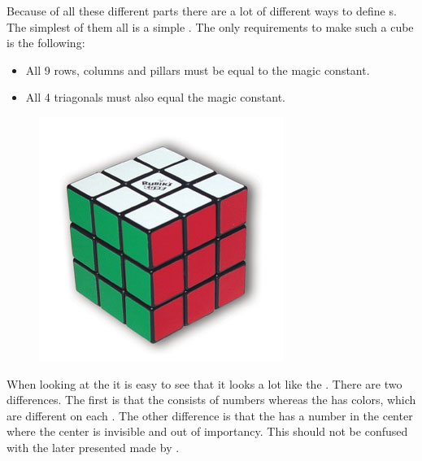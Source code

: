 Because of all these different parts there are a lot of different ways to define  \mcube{}s.
The simplest of them all is a simple  \mcube{}. The only requirements to make such a cube is the following:
\begin{itemize}
	\item All 9 rows, columns and pillars must be equal to the magic constant.
	\item All 4 triagonals must also equal the magic constant.
\end{itemize}

\begin{figure}[h]
	\centering
		\includegraphics[scale=0.4]{input/pics/rubiksCube}
	\caption{}
	\label{fig:rubiksCube}
\end{figure}

When looking at the \rubik{} it is easy to see that it looks a lot like the \mcube{}. 
There are two differences. 
The first is that the \mcube{} consists of numbers whereas the \rubik{} has colors, which are different on each \face{}.
The other difference is that the \mcube{} has a number in the center where the \rubik{} center is invisible and out of importancy. This \mcube{} should not be confused with the later presented \mcube{} made by \erno{}.
